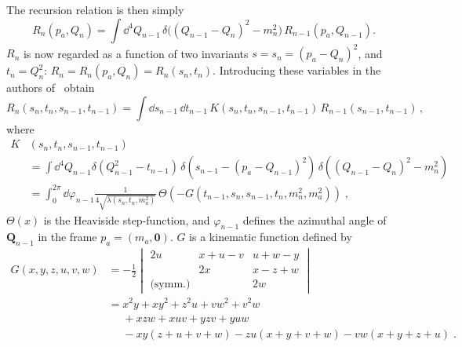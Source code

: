 The recursion relation is then simply
\begin{equation}
    \label{eq:recursion-momentum-transfer}
    R_n(p_a, Q_n) = \int \dd^4 Q_{n-1} \,
        \delta
        \big(
            (Q_{n-1} - Q_n)^2 - m_n^2    
        \big) \, 
        R_{n-1}(p_a, Q_{n-1}) .
\end{equation}
$R_n$ is now regarded as a function of two invariants $s = s_n = (p_a - Q_n)^2$, and $t_n = Q_n^2$: $R_n = R_n(p_a, Q_n) = R_n(s_n, t_n)$. 
Introducing these variables in  the authors of~\cite{Byckling:1969sx} obtain
\begin{equation}
    \label{eq:recursive-momentum-transfer-s-n}
    R_n(s_n, t_n, s_{n-1}, t_{n-1}) = \int \dd s_{n-1} \, \dd t_{n-1} \, 
        K(s_n, t_n, s_{n-1}, t_{n-1}) \, R_{n-1}(s_{n-1}, t_{n-1}) \, ,
\end{equation}
where
\begin{equation}
    \label{eq:recursive-momentum-transfer-k}
    \begin{aligned}
        K&(s_n, t_n, s_{n-1}, t_{n-1}) \\
        & = \int \dd^4 Q_{n-1} \delta(Q^2_{n-1} - t_{n-1}) \, \delta(s_{n-1} - (p_a - Q_{n-1})^2) \, \delta ( (Q_{n-1} - Q_n)^2 - m_n^2) \\
        & = \int_0^{2\pi} \dd \varphi_{n-1} 
            \frac{1}{4 \sqrt{\lambda(s_n, t_n, m_a^2)}} \, 
            \Theta(- G(t_{n-1}, s_n, s_{n-1}, t_n, m_n^2, m_a^2)) \; ,
    \end{aligned}
\end{equation}
$\Theta(x)$ is the Heaviside step-function, and
$\varphi_{n-1}$ defines the azimuthal angle of $\bm{Q}_{n-1}$ in the frame $p_a = (m_a, \bm{0})$. $G$ is a kinematic function defined by
\begin{equation}
    \begin{aligned}
        \label{eq:G-defn}
        G(x,y,z,u,v,w) & = -\frac{1}{2}
        \begin{vmatrix}
            2 u & x + u - v & u + w - y \\
             & 2x & x - z + w \\
            \text{(symm.)} &  & 2w
        \end{vmatrix} \\
        & = x^2 y + xy^2 + z^2 u + v w^2 + v^2 w \\
        & \phantom{=} + xzw + xuv + yzv + yuw \\
        & \phantom{=} - xy(z + u + v + w) - zu (x + y + v + w) - vw(x + y + z + u) \; .
    \end{aligned}
\end{equation}

